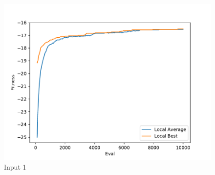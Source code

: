 \documentclass{standalone}
\begin{document}
\begin{figure}[!htb]
	\caption{Input 1}
	\label{fig:graph_1001}
	\includegraphics[width=\textwidth]{../graphs/graphs/1001.pdf}
\end{figure}
\end{document}
